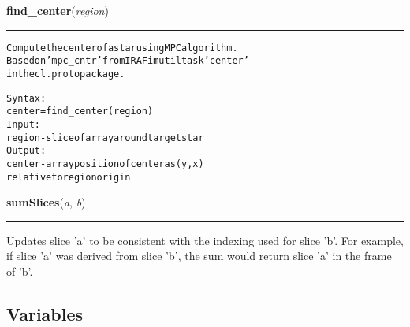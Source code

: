     \begin{boxedminipage}{\textwidth}

    \raggedright \textbf{find\_center}(\textit{region})

    \vspace{-1.5ex}

    \rule{\textwidth}{0.5\fboxrule}
\begin{alltt}
Compute the center of a star using MPC algorithm. 
Based on 'mpc\_cntr' from IRAF imutil task 'center'
in the cl.proto package.

Syntax:
    center = find\_center(region)
Input:
    region - slice of array around target star
Output: 
    center - array position of center as (y,x)
                relative to region origin\end{alltt}

    \vspace{1ex}

    \end{boxedminipage}

    \label{multireg:objectlist:sumSlices}
    \vspace{0.5ex}

    \begin{boxedminipage}{\textwidth}

    \raggedright \textbf{sumSlices}(\textit{a}, \textit{b})

    \vspace{-1.5ex}

    \rule{\textwidth}{0.5\fboxrule}
    Updates slice 'a' to be consistent with the indexing used for slice 
    'b'. For example, if slice 'a' was derived from slice 'b', the sum 
    would return slice 'a' in the frame of 'b'.

    \vspace{1ex}

    \end{boxedminipage}



  \subsection{Variables}


